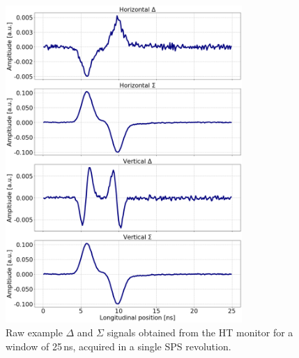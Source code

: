 \begin{figure}[!h]
   \centering         
   \includegraphics[width=0.8\textwidth]{images/Ch4/HT_1D__20180530_114730_exampleAcq_4thesis_turn3000.png}
       \caption{Raw example $\Delta$ and $\Sigma$ signals obtained from the HT monitor for a window of 25\,ns, acquired in a single SPS revolution.}
       \label{fig:HT_example_acq_singleTurn}
\end{figure}


